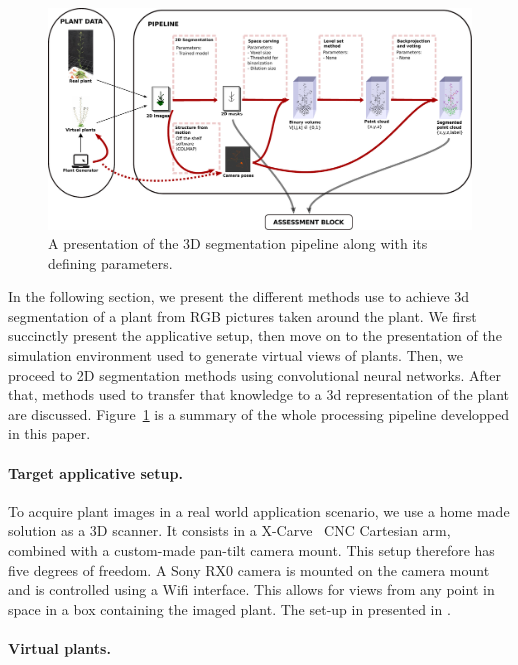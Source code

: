 \begin{figure}[h!]
    \centering \includegraphics[width = \linewidth]{figures/pipeline.pdf}
    \caption{A presentation of the 3D segmentation pipeline along with its
defining parameters.} \label{fig:pipe}
\end{figure}
In the following section, we present the different methods use to achieve 3d
segmentation of a plant from RGB pictures taken around the plant. We first
succinctly present the applicative setup, then move on to the presentation of
the simulation environment used to generate virtual views of plants. Then, we
proceed to 2D segmentation methods using convolutional neural networks. After
that, methods used to transfer that knowledge to a 3d representation of the
plant are discussed. Figure~\ref{fig:pipe} is a summary of the whole processing
pipeline developped in this paper.

\paragraph{Target applicative setup.}
To acquire plant images in a real world application scenario, we use a home made solution as a 3D
scanner. It consists in a X-Carve~\cite{xcarve} CNC Cartesian arm, combined with a
custom-made pan-tilt camera mount. This setup therefore has five degrees of freedom.
A Sony RX0 camera  is mounted on the camera mount and is controlled using a Wifi interface. This allows for views from any point in space in a box containing
the imaged plant. The set-up in presented in \cite{wintz_automated_nodate}.

\paragraph{Virtual plants.}


